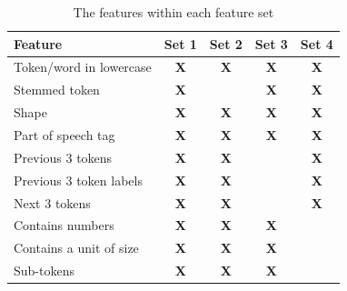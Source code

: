 \documentclass[11pt,oneside]{book}
\begin{document}
\begin{longtable}[c]{|l|c|c|c|c|}
\caption{The features within each feature set}
\label{tab:ner_features_sets}\\
\hline
\textbf{Feature}        & \multicolumn{1}{l|}{\textbf{Set 1}} & \multicolumn{1}{l|}{\textbf{Set 2}} & \multicolumn{1}{l|}{\textbf{Set 3}} & \multicolumn{1}{l|}{\textbf{Set 4}} \\ \hline
\endfirsthead
%
\endhead
%
Token/word in lowercase & \textbf{X}                          & \textbf{X}                          & \textbf{X}                          & \textbf{X}                          \\ \hline
Stemmed token           & \textbf{X}                          & \multicolumn{1}{l|}{}               & \textbf{X}                          & \textbf{X}                          \\ \hline
Shape                   & \textbf{X}                          & \textbf{X}                          & \textbf{X}                          & \textbf{X}                          \\ \hline
Part of speech tag      & \textbf{X}                          & \textbf{X}                          & \textbf{X}                          & \textbf{X}                          \\ \hline
Previous 3 tokens       & \textbf{X}                          & \textbf{X}                          & \multicolumn{1}{l|}{}               & \textbf{X}                          \\ \hline
Previous 3 token labels & \textbf{X}                          & \textbf{X}                          & \multicolumn{1}{l|}{}               & \textbf{X}                          \\ \hline
Next 3 tokens           & \textbf{X}                          & \textbf{X}                          & \multicolumn{1}{l|}{}               & \textbf{X}                          \\ \hline
Contains numbers        & \textbf{X}                          & \textbf{X}                          & \textbf{X}                          & \multicolumn{1}{l|}{}               \\ \hline
Contains a unit of size & \textbf{X}                          & \textbf{X}                          & \textbf{X}                          & \multicolumn{1}{l|}{}               \\ \hline
Sub-tokens              & \textbf{X}                          & \textbf{X}                          & \textbf{X}                          & \multicolumn{1}{l|}{}               \\ \hline
\end{longtable}
\end{document}
